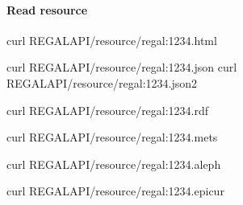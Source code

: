 \documentclass[letterpaper,10pt,english]{sphinxmanual}
\begin{document}
\paragraph{Read resource}
\label{\detokenize{api-toscience:read-resource}}\label{\detokenize{api-toscience:id10}}
\sphinxAtStartPar
{}

\begin{sphinxVerbatim}[commandchars=\\\{\}]
curl \PYGZdl{}REGAL\PYGZus{}API/resource/regal:1234.html
\end{sphinxVerbatim}

\sphinxAtStartPar
{}

\begin{sphinxVerbatim}[commandchars=\\\{\}]
curl \PYGZdl{}REGAL\PYGZus{}API/resource/regal:1234.json
curl \PYGZdl{}REGAL\PYGZus{}API/resource/regal:1234.json2
\end{sphinxVerbatim}

\sphinxAtStartPar
{}

\begin{sphinxVerbatim}[commandchars=\\\{\}]
curl \PYGZdl{}REGAL\PYGZus{}API/resource/regal:1234.rdf
\end{sphinxVerbatim}

\sphinxAtStartPar
{}

\begin{sphinxVerbatim}[commandchars=\\\{\}]
curl \PYGZdl{}REGAL\PYGZus{}API/resource/regal:1234.mets
\end{sphinxVerbatim}

\sphinxAtStartPar
{}

\begin{sphinxVerbatim}[commandchars=\\\{\}]
curl \PYGZdl{}REGAL\PYGZus{}API/resource/regal:1234.aleph
\end{sphinxVerbatim}

\sphinxAtStartPar
{}

\begin{sphinxVerbatim}[commandchars=\\\{\}]
curl \PYGZdl{}REGAL\PYGZus{}API/resource/regal:1234.epicur
\end{sphinxVerbatim}

\sphinxAtStartPar
{}
\end{document}
